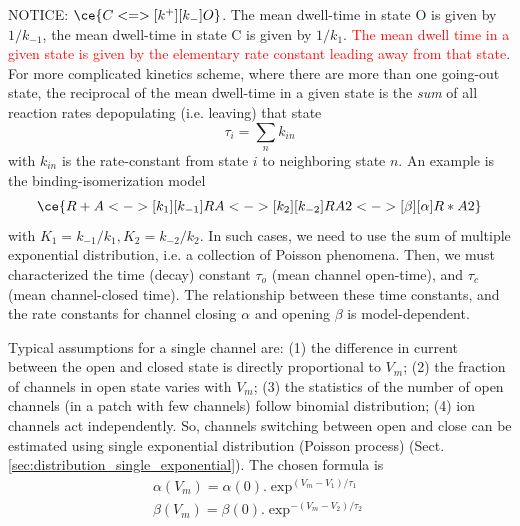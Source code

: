 \begin{framed}

NOTICE: $\ce{C <=>[k^+][k_-] O}$. The mean dwell-time in state O is given by
$1/k_{-1}$, the mean dwell-time in state C is given by $1/k_1$.
\textcolor{red}{The mean dwell time in a given state is given by the elementary
rate constant leading away from that state}. For more complicated kinetics
scheme, where there are more than one going-out state, the reciprocal of the
mean dwell-time in a given state is the {\it sum} of all reaction rates
depopulating (i.e. leaving) that state
\begin{equation}
\tau_i = \sum_{n} k_{in}
\end{equation}
with $k_{in}$ is the rate-constant from state $i$ to neighboring state $n$. An
example is the binding-isomerization model
\begin{equation}
\ce{R + A <->[k_1][k_{-1}] RA <->[k_2][k_{-2}] RA2 <->[\beta][\alpha] R*A2 }
\end{equation}
with $K_1=k_{-1}/k_1, K_2=k_{-2}/k_2$.  In such cases, we need to use the sum of
multiple exponential distribution, i.e.  a collection of Poisson phenomena.
Then, we must characterized the time (decay) constant $\tau_o$ (mean channel
open-time), and $\tau_c$ (mean channel-closed time). The relationship between
these time constants, and the rate constants for channel closing $\alpha$ and
opening $\beta$ is model-dependent.
\end{framed}



Typical assumptions for a single channel are: (1) the difference in current
between the open and closed state is directly proportional to $V_m$; (2) the
fraction of channels in open state varies with $V_m$; (3) the statistics of the
number of open channels (in a patch with few channels) follow binomial
distribution; (4) ion channels act independently. So, channels switching between
open and close can be estimated using single exponential distribution (Poisson
process) (Sect.\ref{sec:distribution_single_exponential}).  The chosen formula is
\begin{equation}
\begin{split}
\alpha(V_m) = \alpha(0).\exp^{(V_m-V_1)/\tau_1} \\
\beta(V_m) = \beta(0).\exp^{-(V_m-V_2)/\tau_2}
\end{split}
\end{equation}

